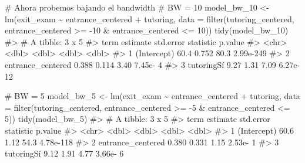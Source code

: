\documentclass[
  letterpaper,
  DIV=11,
  numbers=noendperiod,
  oneside]{scrreprt}
\newenvironment{Shaded}{\begin{snugshade}}{\end{snugshade}}
\newcommand{\AttributeTok}[1]{\textcolor[rgb]{0.40,0.45,0.13}{#1}}
\newcommand{\CommentTok}[1]{\textcolor[rgb]{0.37,0.37,0.37}{#1}}
\newcommand{\DecValTok}[1]{\textcolor[rgb]{0.68,0.00,0.00}{#1}}
\newcommand{\FunctionTok}[1]{\textcolor[rgb]{0.28,0.35,0.67}{#1}}
\newcommand{\NormalTok}[1]{\textcolor[rgb]{0.00,0.23,0.31}{#1}}
\newcommand{\OtherTok}[1]{\textcolor[rgb]{0.00,0.23,0.31}{#1}}
\newcommand{\SpecialCharTok}[1]{\textcolor[rgb]{0.37,0.37,0.37}{#1}}
\begin{document}
\begin{Shaded}
\begin{Highlighting}[]
\CommentTok{\# Ahora probemos bajando el bandwidth}
\CommentTok{\# BW = 10}
\NormalTok{model\_bw\_10 }\OtherTok{\textless{}{-}} \FunctionTok{lm}\NormalTok{(exit\_exam }\SpecialCharTok{\textasciitilde{}}\NormalTok{ entrance\_centered }\SpecialCharTok{+}\NormalTok{ tutoring,}
                  \AttributeTok{data =} \FunctionTok{filter}\NormalTok{(tutoring\_centered,}
\NormalTok{                                entrance\_centered }\SpecialCharTok{\textgreater{}=} \SpecialCharTok{{-}}\DecValTok{10} \SpecialCharTok{\&} 
\NormalTok{                                  entrance\_centered }\SpecialCharTok{\textless{}=} \DecValTok{10}\NormalTok{))}
\FunctionTok{tidy}\NormalTok{(model\_bw\_10)}
\CommentTok{\#\textgreater{} \# A tibble: 3 x 5}
\CommentTok{\#\textgreater{}   term              estimate std.error statistic   p.value}
\CommentTok{\#\textgreater{}   \textless{}chr\textgreater{}                \textless{}dbl\textgreater{}     \textless{}dbl\textgreater{}     \textless{}dbl\textgreater{}     \textless{}dbl\textgreater{}}
\CommentTok{\#\textgreater{} 1 (Intercept)         60.4       0.752     80.3  2.99e{-}249}
\CommentTok{\#\textgreater{} 2 entrance\_centered    0.388     0.114      3.40 7.45e{-}  4}
\CommentTok{\#\textgreater{} 3 tutoringSí           9.27      1.31       7.09 6.27e{-} 12}

\CommentTok{\# BW = 5}
\NormalTok{model\_bw\_5 }\OtherTok{\textless{}{-}} \FunctionTok{lm}\NormalTok{(exit\_exam }\SpecialCharTok{\textasciitilde{}}\NormalTok{ entrance\_centered }\SpecialCharTok{+}\NormalTok{ tutoring,}
                 \AttributeTok{data =} \FunctionTok{filter}\NormalTok{(tutoring\_centered,}
\NormalTok{                               entrance\_centered }\SpecialCharTok{\textgreater{}=} \SpecialCharTok{{-}}\DecValTok{5} \SpecialCharTok{\&} 
\NormalTok{                                 entrance\_centered }\SpecialCharTok{\textless{}=} \DecValTok{5}\NormalTok{))}
\FunctionTok{tidy}\NormalTok{(model\_bw\_5)}
\CommentTok{\#\textgreater{} \# A tibble: 3 x 5}
\CommentTok{\#\textgreater{}   term              estimate std.error statistic   p.value}
\CommentTok{\#\textgreater{}   \textless{}chr\textgreater{}                \textless{}dbl\textgreater{}     \textless{}dbl\textgreater{}     \textless{}dbl\textgreater{}     \textless{}dbl\textgreater{}}
\CommentTok{\#\textgreater{} 1 (Intercept)         60.6       1.12      54.3  4.78e{-}118}
\CommentTok{\#\textgreater{} 2 entrance\_centered    0.380     0.331      1.15 2.53e{-}  1}
\CommentTok{\#\textgreater{} 3 tutoringSí           9.12      1.91       4.77 3.66e{-}  6}


\end{Highlighting}
\end{Shaded}
\end{document}
